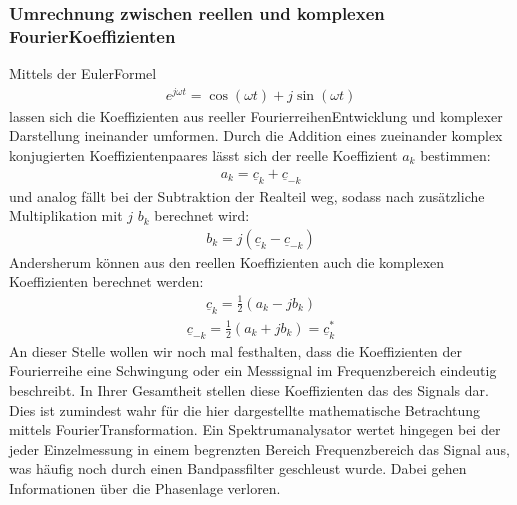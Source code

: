 \documentclass[letterpaper,10pt,english]{jupyterBook}
\begin{document}
\subsubsection{Umrechnung zwischen reellen und komplexen Fourier\sphinxhyphen{}Koeffizienten}
\label{\detokenize{content/3_FourierAnalyse:umrechnung-zwischen-reellen-und-komplexen-fourier-koeffizienten}}
\sphinxAtStartPar
Mittels der Euler\sphinxhyphen{}Formel
\begin{equation*}
\begin{split}e^{j\omega t} = \cos(\omega t) + j \sin(\omega t)\end{split}
\end{equation*}
\sphinxAtStartPar
lassen sich die Koeffizienten aus reeller Fourierreihen\sphinxhyphen{}Entwicklung und komplexer Darstellung ineinander umformen. Durch die Addition eines zueinander komplex konjugierten Koeffizientenpaares lässt sich der reelle Koeffizient \(a_k\) bestimmen:
\begin{equation*}
\begin{split}a_k = \underline{c}_{k} + \underline{c}_{-k}\end{split}
\end{equation*}
\sphinxAtStartPar
und analog fällt bei der Subtraktion der Realteil weg, sodass nach zusätzliche Multiplikation mit \(j\) \(b_k\) berechnet wird:
\begin{equation*}
\begin{split}b_k = j (\underline{c}_{k} - \underline{c}_{-k})\end{split}
\end{equation*}
\sphinxAtStartPar
Andersherum können aus den reellen Koeffizienten auch die komplexen Koeffizienten berechnet werden:
\begin{equation*}
\begin{split}\underline c_k = \frac{1}{2} (a_k - j b_k)\end{split}
\end{equation*}\begin{equation*}
\begin{split}\underline c_{-k} = \frac{1}{2} (a_k + j b_k) = \underline c_k^*\end{split}
\end{equation*}
\sphinxAtStartPar
An dieser Stelle wollen wir noch mal festhalten, dass die Koeffizienten der Fourierreihe eine Schwingung oder ein Messsignal im Frequenzbereich eindeutig beschreibt. In Ihrer Gesamtheit stellen diese Koeffizienten das  des Signals dar. Dies ist zumindest wahr für die hier dargestellte mathematische Betrachtung mittels Fourier\sphinxhyphen{}Transformation. Ein Spektrumanalysator wertet hingegen bei der jeder Einzelmessung in einem begrenzten Bereich Frequenzbereich das Signal aus, was häufig noch durch einen Bandpassfilter geschleust wurde. Dabei gehen Informationen über die Phasenlage verloren.
\end{document}

